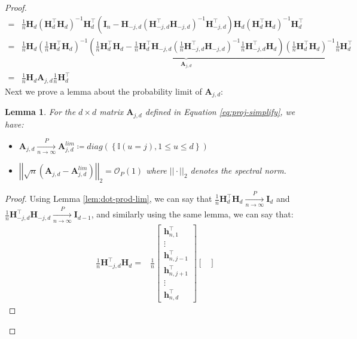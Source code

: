 \documentclass[
  12pt]{article}
\newcommand{\pnlim}{\xrightarrow[n \to \infty]{P}}
\newcommand{\bigo}{\mathcal{O}}
\newcommand{\bh}{\boldsymbol{h}}
\newcommand{\bA}{\boldsymbol{A}}
\newcommand{\bI}{\boldsymbol{I}}
\newtheorem{lemma}{Lemma}
\newcommand{\bH}{\boldsymbol{H}}
\begin{document}
\begin{proof}
\begin{equation}
\begin{split}
        = & \frac{1}{n}\bH_{d}\left(\bH_{d}^\top\bH_{d}\right)^{-1}\bH_{d}^\top\left(\bI_n - \bH_{-j,d}\left(\bH_{-j,d}^\top\bH_{-j,d}\right)^{-1}\bH_{-j,d}^\top\right)\bH_{d}\left(\bH_{d}^\top\bH_{d}\right)^{-1}\bH_{d}^\top\\
        = & \frac{1}{n}\bH_{d}\underbrace{\left(\frac{1}{n}\bH_{d}^\top\bH_{d}\right)^{-1}\left(\frac{1}{n}\bH_{d}^\top\bH_{d} - \frac{1}{n}\bH_{d}^\top\bH_{-j,d}\left(\frac{1}{n}\bH_{-j,d}^\top\bH_{-j,d}\right)^{-1}\frac{1}{n}\bH_{-j,d}^\top\bH_{d}\right)\left(\frac{1}{n}\bH_{d}^\top\bH_{d}\right)^{-1}}_{\bA_{j,d}}\frac{1}{n}\bH_{d}^\top\\
        = &  \frac{1}{n}\bH_{d} \bA_{j,d}\frac{1}{n}\bH_{d}^\top
    \end{split}
\end{equation}
Next we prove a lemma about the probability limit of $\bA_{j,d}$:
\begin{lemma}\label{lem:A-lim}
    For the $d \times d$ matrix $\bA_{j,d}$ defined in Equation \ref{eq:proj-simplify}, we have:
    \begin{itemize}
        \item $\bA_{j,d} \pnlim \bA^{lim}_{j,d}\coloneqq diag(\left\{\mathbb{I}(u = j), 1 \leq u \leq d\right\})$
        \item $\left|\left|\sqrt{n}\left(\bA_{j,d} - \bA^{lim}_{j,d}\right)\right|\right|_2 = \bigo_P(1)$ where $||\cdot||_2$ denotes the spectral norm.
    \end{itemize}
\end{lemma}
\begin{proof}
    Using Lemma \ref{lem:dot-prod-lim}, we can say that $\frac{1}{n}\bH_{d}^\top\bH_{d} \pnlim \bI_d$ and $\frac{1}{n}\bH_{-j,d}^\top\bH_{-j,d} \pnlim \bI_{d-1}$, and similarly using the same lemma, we can say that:
    \begin{equation}\label{eq:cross-basis-inner}
        \begin{split}
              \frac{1}{n}\bH_{-j,d}^\top\bH_{d} = & \frac{1}{n}\begin{bmatrix}
            \bh^\top_{n,1}\\
            \vdots\\
            \bh^\top_{n,j-1}\\
            \bh^\top_{n,j+1}\\
            \vdots\\
            \bh^\top_{n,d}
        \end{bmatrix}
        \begin{bmatrix}

\end{bmatrix}
\end{split}
\end{equation}
\end{proof}
\end{proof}
\end{document}
